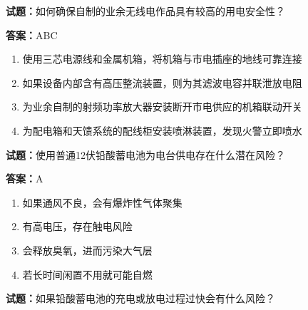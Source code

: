 \documentclass{ctexbook}
\begin{document}




\vspace{1em}

\textbf{试题：}如何确保自制的业余无线电作品具有较高的用电安全性？ 

\textbf{答案：}ABC 

\begin{enumerate}[leftmargin=3em]
  \item 使用三芯电源线和金属机箱，将机箱与市电插座的地线可靠连接 

  \item 如果设备内部含有高压整流装置，则为其滤波电容并联泄放电阻 

  \item 为业余自制的射频功率放大器安装断开市电供应的机箱联动开关 

  \item 为配电箱和天馈系统的配线柜安装喷淋装置，发现火警立即喷水 

\end{enumerate}






\vspace{1em}

\textbf{试题：}使用普通12伏铅酸蓄电池为电台供电存在什么潜在风险？ 

\textbf{答案：}A 

\begin{enumerate}[leftmargin=3em]
  \item 如果通风不良，会有爆炸性气体聚集 

  \item 有高电压，存在触电风险 

  \item 会释放臭氧，进而污染大气层 

  \item 若长时间闲置不用就可能自燃 

\end{enumerate}





\vspace{1em}

\textbf{试题：}如果铅酸蓄电池的充电或放电过程过快会有什么风险？ 
\end{document}
